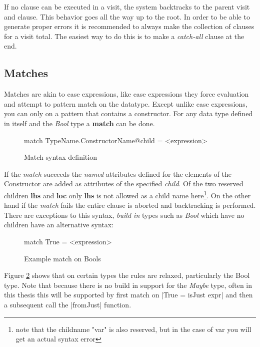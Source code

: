 If no clause can be executed in a visit, the system backtracks to the parent visit and clause. This behavior goes all the way up to the root. In order to be able to generate proper errors it is recommended to always make the collection of clauses for a visit total. The easiest way to do this is to make a \emph{catch-all} clause at the end.

\subsection{Matches}
Matches are akin to case expressions, like case expressions they force evaluation and attempt to pattern match on the datatype. Except unlike case expressions, you can only on a pattern that contains a constructor. For any data type defined in \rcore itself and the \emph{Bool} type a \textbf{match} can be done.

\begin{figure}[h!]
\begin{code}
match TypeName.ConstructorName@child  = <expression>
\end{code}
\caption{Match syntax definition}
\label{match:syntax}
\end{figure}

If the \emph{match} succeeds the \emph{named} attributes defined for the elements of the Constructor are added as attributes of the specified \emph{child}. Of the two reserved children \textbf{lhs} and \textbf{loc} only \textbf{lhs} is not allowed as a child name here\footnote{note that the childname "var" is also reserved, but in the case of var you will get an actual syntax error}. On the other hand if the \emph{match} fails the entire clause is aborted and backtracking is performed.
There are exceptions to this syntax, \emph{build in} types such as \emph{Bool} which have no children have an alternative syntax:

\begin{figure}[h!]
\begin{code}
match True = <expression>
\end{code}
\caption{Example match on Bools}
\label{match:bool}
\end{figure}

Figure \ref{match:bool} shows that on certain types the rules are relaxed, particularly the Bool type. Note that because there is no build in support for the \emph{Maybe} type, often in this thesis this will be supported by first match on |True = isJust expr| and then a subsequent call the |fromJust| function.

